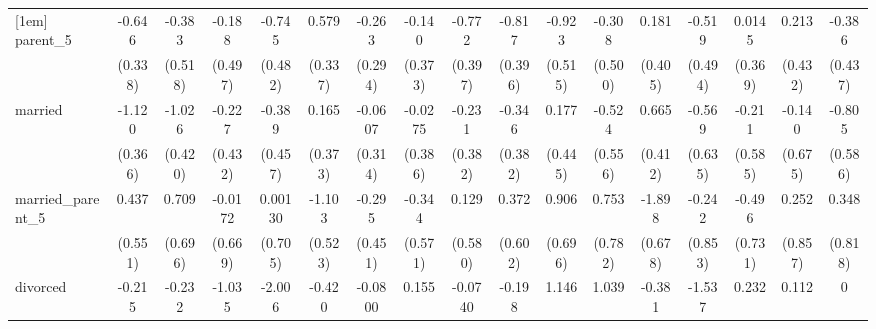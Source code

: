 {\begin{tabular}{l*{16}{c}}
[1em]
parent\_5            &      -0.646         &      -0.383         &      -0.188         &      -0.745         &       0.579         &      -0.263         &      -0.140         &      -0.772         &      -0.817\sym{*}  &      -0.923         &      -0.308         &       0.181         &      -0.519         &      0.0145         &       0.213         &      -0.386         \\
                    &     (0.338)         &     (0.518)         &     (0.497)         &     (0.482)         &     (0.337)         &     (0.294)         &     (0.373)         &     (0.397)         &     (0.396)         &     (0.515)         &     (0.500)         &     (0.405)         &     (0.494)         &     (0.369)         &     (0.432)         &     (0.437)         \\
[1em]
married             &      -1.120\sym{**} &      -1.026\sym{*}  &      -0.227         &      -0.389         &       0.165         &     -0.0607         &     -0.0275         &      -0.231         &      -0.346         &       0.177         &      -0.524         &       0.665         &      -0.569         &      -0.211         &      -0.140         &      -0.805         \\
                    &     (0.366)         &     (0.420)         &     (0.432)         &     (0.457)         &     (0.373)         &     (0.314)         &     (0.386)         &     (0.382)         &     (0.382)         &     (0.445)         &     (0.556)         &     (0.412)         &     (0.635)         &     (0.585)         &     (0.675)         &     (0.586)         \\
[1em]
married\_parent\_5    &       0.437         &       0.709         &     -0.0172         &     0.00130         &      -1.103\sym{*}  &      -0.295         &      -0.344         &       0.129         &       0.372         &       0.906         &       0.753         &      -1.898\sym{**} &      -0.242         &      -0.496         &       0.252         &       0.348         \\
                    &     (0.551)         &     (0.696)         &     (0.669)         &     (0.705)         &     (0.523)         &     (0.451)         &     (0.571)         &     (0.580)         &     (0.602)         &     (0.696)         &     (0.782)         &     (0.678)         &     (0.853)         &     (0.731)         &     (0.857)         &     (0.818)         \\
[1em]
divorced            &      -0.215         &      -0.232         &      -1.035         &      -2.006         &      -0.420         &     -0.0800         &       0.155         &     -0.0740         &      -0.198         &       1.146         &       1.039         &      -0.381         &      -1.537         &       0.232         &       0.112         &           0         \\

\end{tabular}}
